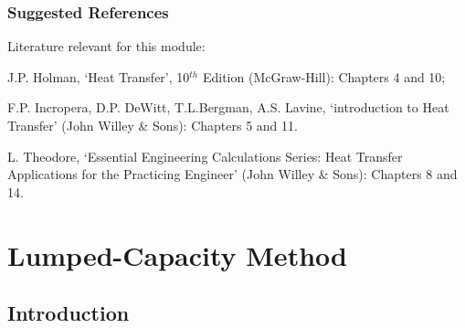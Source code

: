 \documentclass[10pt,compress]{beamer}
\begin{document}
\begin{frame}
 \frametitle{Suggested References}
  Literature relevant for this module:
  \begin{enumerate}[{[}1{]}]
    \item J.P. Holman, `Heat Transfer', 10$^{th}$ Edition (McGraw-Hill): Chapters 4 and 10;
    \item F.P. Incropera, D.P. DeWitt, T.L.Bergman, A.S. Lavine, `introduction to Heat Transfer' (John Willey $\&$ Sons): Chapters 5 and 11.
    \item L. Theodore, `Essential Engineering Calculations Series: Heat Transfer Applications for the Practicing Engineer' (John Willey $\&$ Sons): Chapters 8 and 14.
  \end{enumerate}
\end{frame}
 

\section{Lumped-Capacity Method}

\subsection{Introduction}
\end{document}
